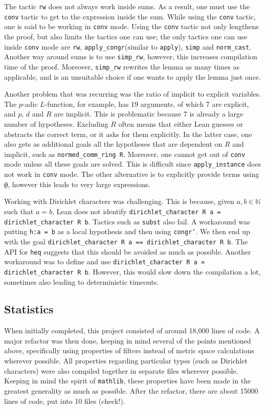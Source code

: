 \documentclass[a4paper,UKenglish,cleveref, autoref, thm-restate]{lipics-v2021}
\newcommand{\lean}[1]{\texttt{#1}\xspace} %
\begin{document}
The tactic \lean{rw} does not always work inside sums. As a result, one must use 
the \lean{conv} tactic to get to the expression inside the sum. While using the \lean{conv} tactic, one is said to be working 
in \lean{conv} mode. Using the \lean{conv} tactic not only lengthens the proof, but also limits the tactics one can use; the 
only tactics one can use inside \lean{conv} mode are \lean{rw}, \lean{apply\_congr}(similar to \lean{apply}), \lean{simp} and 
\lean{norm\_cast}. Another way around sums is to use \lean{simp\_rw}, however, this increases compilation time of the proof. 
Moreover, \lean{simp\_rw} rewrites the lemma as many times as applicable, and is an unsuitable choice if one wants to apply 
the lemma just once. 

Another problem that was recurring was the ratio of implicit to explicit variables. The $p$-adic $L$-function, for example, has 19 arguments, of which 7 are explicit, and $p$, 
$d$ and $R$ are implicit. This is problematic because 7 is already a large number of hypotheses. Excluding $R$ often means that either Lean guesses or abstracts the correct term, 
or it asks for them explicitly. In the latter case, one also gets as additional goals all the hypotheses that are dependent on $R$ and implicit, such as \lean{normed\_comm\_ring R}. 
Moreover, one cannot get out of \lean{conv} mode unless all these goals are solved. This is difficult since \lean{apply\_instance} does not work in \lean{conv} mode. The other 
alternative is to explicitly provide terms using \lean{@}, however this leads to very large expressions. 

Working with Dirichlet characters was challenging. This is because, given $a, b \in \mathbb{N}$ such that $a = b$, Lean does not identify 
\lean{dirichlet\_character R a = dirichlet\_character R b}. Tactics such as \lean{subst} also fail. A workaround was putting \lean{h:a = b} as a local hypothesis and then using 
\lean{congr'}. We then end up with the goal \lean{dirichlet\_character R a == dirichlet\_character R b}. The API for \lean{heq} suggests that this should be avoided as much as possible. 
Another workaround was to define and use \lean{dirichlet\_character R a ≃ dirichlet\_character R b}. However, this would slow down the compilation a lot, sometimes also leading to 
deterministic timeouts. 

\subsection{Statistics}
When initially completed, this project consisted of around 18,000 lines of code. A major refactor was then done, keeping in mind several of the points mentioned above, specifically 
using properties of filters instead of metric space calculations wherever possible. All properties regarding particular types (such as Dirichlet characters) were also compiled together 
in separate files wherever possible. Keeping in mind the spirit of \lean{mathlib}, these properties have been made in the greatest generality as much as possible. 
After the refactor, there are about 15000 lines of code, put into 10 files (check!). 
\end{document}
